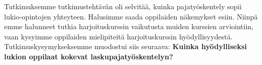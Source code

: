 Tutkimuksemme tutkimustehtävän oli selvitää, kuinka pajatyöskentely sopii lukio-opintojen yhteyteen.
Halusimme saada oppilaiden näkemykset esiin.
Niinpä emme halunneet tutkia harjoituskurssin vaikutusta muiden kurssien arviointiin, vaan kysyimme oppilaiden mielipiteitä harjoituskurssin hyödyllisyydestä.
Tutkimuskysymykseksemme muodostui siis seuraava:
\textbf{Kuinka hyödylliseksi lukion oppilaat kokevat laskupajatyöskentelyn?}

